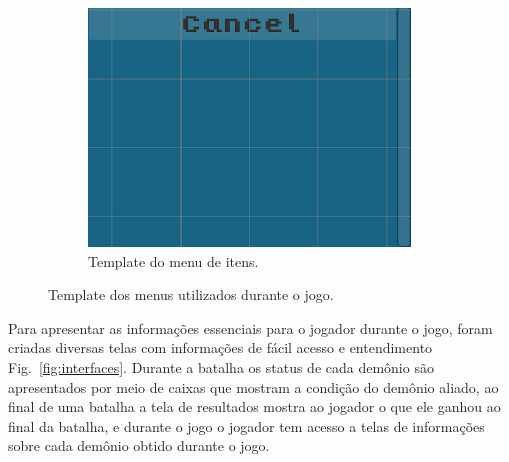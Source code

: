 \begin{figure}[h!]
\begin{subfigure}[b]{0.35\linewidth}
    \includegraphics[width=\linewidth]{bagtemplate.jpg}
    \caption{Template do menu de itens.}
  \end{subfigure}
  \caption{Template dos menus utilizados durante o jogo.}
  \label{fig:menus}
\end{figure}

Para apresentar as informações essenciais para o jogador durante o jogo, foram criadas diversas telas com informações de fácil acesso e entendimento Fig.~\ref{fig:interfaces}. Durante a batalha os status de cada demônio são apresentados por meio de caixas que mostram a condição do demônio aliado, ao final de uma batalha a tela de resultados mostra ao jogador o que ele ganhou ao final da batalha, e durante o jogo o jogador tem acesso a telas de informações sobre cada demônio obtido durante o jogo.

